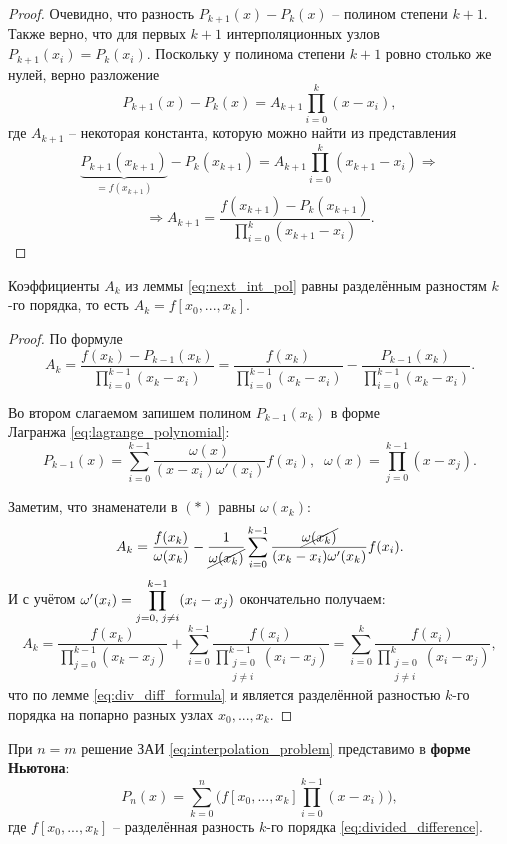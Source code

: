 \documentclass[../main.tex]{subfile}
\begin{document}
\begin{proof}
	Очевидно, что разность $P_{k+1}(x)-P_{k}(x)$ -- полином степени $k+1$.
	Также верно, что для первых $k+1$ интерполяционных узлов $P_{k+1}(x_i)=
	P_{k}(x_i)$. Поскольку у полинома степени $k+1$ ровно столько же нулей,
	верно разложение
	\[P_{k+1}(x)-P_{k}(x)=A_{k+1}\prod_{i=0}^{k}(x-x_i),\]
	где $A_{k+1}$ -- некоторая константа, которую можно найти из представления
	\[\underset{=f(x_{k+1})}{\underbrace{P_{k+1}(x_{k+1})}}-P_{k}(x_{k+1})=
	A_{k+1}\prod_{i=0}^{k}(x_{k+1}-x_i)\Rightarrow\]
	\[\Rightarrow \boxed{A_{k+1}=\frac{f(x_{k+1})-P_k(x_{k+1})}
	{\prod_{i=0}^{k}(x_{k+1}-x_i)}}.\]
\end{proof}

\begin{lemma}\label{eq:newton_koef_formula}
	Коэффициенты $A_k$ из леммы \eqref{eq:next_int_pol} равны разделённым
	разностям $k$-го порядка, то есть $A_k=f[x_0,...,x_k].$

\end{lemma}

\begin{proof}
	По формуле
	\[A_k=\frac{f(x_k)-P_{k-1}(x_k)}{\prod_{i=0}^{k-1}(x_k-x_i)}=
	\frac{f(x_k)}{\prod_{i=0}^{k-1}(x_k-x_i)} - \frac{P_{k-1}(x_k)}
	{\prod_{i=0}^{k-1}(x_k-x_i)}.\tag{*}\]

	Во втором слагаемом запишем полином $P_{k-1}(x_k)$ в форме\\Лагранжа
	\eqref{eq:lagrange_polynomial}:
	\[P_{k-1}(x)=\sum_{i=0}^{k-1}\frac{\omega(x)}{(x-x_i)\omega'(x_i)}
	f(x_i),\;\;
	\omega(x)=\prod_{j=0}^{k-1}(x-x_j).\]

	Заметим, что знаменатели в $(*)$ равны $\omega(x_k)$:
	\[A_k=\frac{f(x_k)}{\omega(x_k)} - \frac{1}{\cancel{\omega(x_k)}}
	\sum_{i=0}^{k-1}\frac{\cancel{\omega(x_k)}}{(x_k-x_i)\omega'(x_k)}
	f(x_i).\]
	И с учётом
	$\omega'(x_i)=\mathlarger\prod_{j=0,\;j\ne i}^{k-1}(x_i-x_j)$
	окончательно получаем:
	\[A_k=\frac{f(x_k)}{\prod_{j=0}^{k-1}(x_k-x_j)} +
	\sum_{i=0}^{k-1}\frac{f(x_i)}{\prod_{\substack{j=0\\j\ne i}}^{k-1}
	(x_i-x_j)}=\sum_{i=0}^{k}\frac{f(x_i)}{\prod_{\substack{j=0\\j\ne i}}^
	{k}(x_i-x_j)},\]
	что по лемме \eqref{eq:div_diff_formula} и является разделённой
	разностью $k$-го порядка на попарно разных узлах $x_0,...,x_k$.
\end{proof}

\begin{theorem}\label{eq:newton_polynomial}
	При $n=m$ решение ЗАИ \eqref{eq:interpolation_problem} представимо в
	\textbf{форме Ньютона}:
	\[\boxed{P_n(x)=\sum_{k=0}^{n}\big(f[x_0,...,x_k]\prod_{i=0}^{k-1}
	(x-x_i)\big)},\]
	где $f[x_0,...,x_k]$ -- разделённая разность $k$-го порядка
	\eqref{eq:divided_difference}.
\end{theorem}
\end{document}

